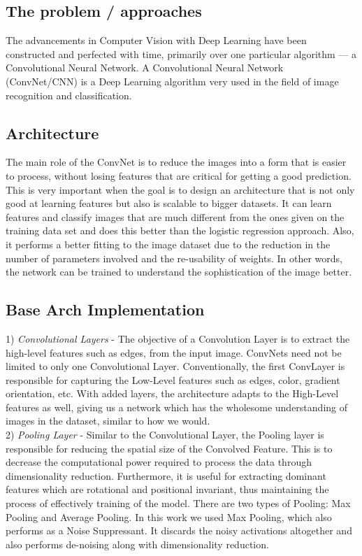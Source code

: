 \documentclass[conference]{IEEEtran}
\begin{document}
\subsection{The problem / approaches}

The advancements in Computer Vision with Deep Learning have been constructed and perfected with time, primarily over one particular algorithm — a Convolutional Neural Network. A Convolutional Neural Network (ConvNet/CNN) is a Deep Learning algorithm very used in the field of image recognition and classification.\cite{towardsdatascience_Saha}

\subsection{Architecture}

The main role of the ConvNet is to reduce the images into a form that is easier to process, without losing features that are critical for getting a good prediction. This is very important when the goal is to design an architecture that is not only good at learning features but also is scalable to bigger datasets. It can learn features and classify images that are much different from the ones given on the training data set and does this better than the logistic regression approach. Also, it performs a better fitting to the image dataset due to the reduction in the number of parameters involved and the re-usability of weights. In other words, the network can be trained to understand the sophistication of the image better.\cite{towardsdatascience_Saha}

\subsection{Base Arch Implementation}

1) \textit{Convolutional Layers} - The objective of a Convolution Layer is to extract the high-level features such as edges, from the input image. ConvNets need not be limited to only one Convolutional Layer. Conventionally, the first ConvLayer is responsible for capturing the Low-Level features such as edges, color, gradient orientation, etc. With added layers, the architecture adapts to the High-Level features as well, giving us a network which has the wholesome understanding of images in the dataset, similar to how we would.\cite{towardsdatascience_Saha} \\

2) \textit{Pooling Layer} - Similar to the Convolutional Layer, the Pooling layer is responsible for reducing the spatial size of the Convolved Feature. This is to decrease the computational power required to process the data through dimensionality reduction. Furthermore, it is useful for extracting dominant features which are rotational and positional invariant, thus maintaining the process of effectively training of the model. There are two types of Pooling: Max Pooling and Average Pooling. In this work we used Max Pooling, which also performs as a Noise Suppressant. It discards the noisy activations altogether and also performs de-noising along with dimensionality reduction.\cite{towardsdatascience_Saha} \\
\end{document}
